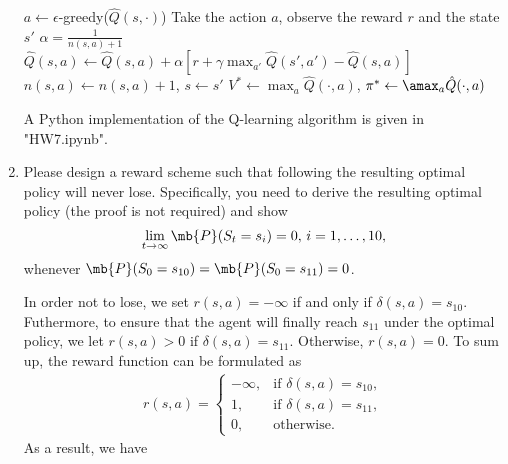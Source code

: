 \begin{exercise}
\begin{enumerate}
\begin{solution}
\begin{center}
\begin{minipage}{.8\linewidth}
\begin{algorithm}[H]
\begin{algorithmic}[1]
                                \STATE $a \gets \epsilon$-greedy($\hat{Q}(s, \cdot)$)
                                \STATE Take the action $a$, observe the reward $r$ and the state $s'$
                                \STATE $\alpha = \frac{1}{n(s,a) + 1}$
                                \STATE $\hat{Q}(s, a) \gets \hat{Q}(s, a) + \alpha \left[r + \gamma \max_{a'} \hat{Q}(s', a') - \hat{Q}(s, a)\right]$
                                \STATE $n(s,a) \gets n(s,a) + 1$, $s \gets s'$
                                \ENDWHILE
                                \ENDFOR
                                \STATE $V^* \gets \max_{a} \hat{Q}(\cdot,a)$, $\pi^* \gets \amax_{a} \hat{Q}(\cdot,a)$
                            \end{algorithmic}
                        \end{algorithm}
                    \end{minipage}
                \end{center}
                A Python implementation of the Q-learning algorithm is given in "HW7.ipynb".
                \qedhere
            \end{solution}
        \item
            Please design a reward scheme such that following the resulting optimal policy will never lose. Specifically, you need to derive the resulting optimal policy (the proof is not required) and show  $$\lim_{t\rightarrow\infty}\mb{P}(S_t=s_i)=0,\,i=1,\ldots,10,$$
            whenever $\mb{P}(S_0=s_{10})=\mb{P}(S_0=s_{11})=0$.
            \begin{solution}
                In order not to lose, we set $r(s,a)=-\infty$ if and only if $\delta(s,a)=s_{10}$. Futhermore, to ensure that the agent will finally reach $s_{11}$ under the optimal policy, we let $r(s,a)>0$ if $\delta(s,a)=s_{11}$. Otherwise, $r(s,a)=0$. To sum up, the reward function can be formulated as
                \begin{align*}
                    r(s,a) = \begin{cases}
                                 -\infty, & \text{if } \delta(s,a) = s_{10}, \\
                                 1,       & \text{if } \delta(s,a) = s_{11}, \\
                                 0,       & \text{otherwise}.
                             \end{cases}
                \end{align*}
                As a result, we have
                \begin{itemize}

\end{itemize}
\end{solution}
\end{enumerate}
\end{exercise}
